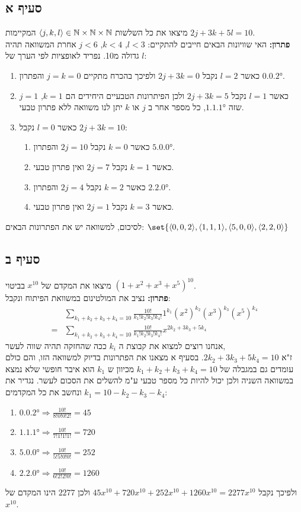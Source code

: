 \documentclass{article}
\DeclarePairedDelimiter\set\{\}
\begin{document}
	\subsection*{סעיף א}
	מיצאו את כל השלשות $\langle j,k,l \rangle \in \mathbb{N} \times \mathbb{N} \times \mathbb{N}$ המקיימות $2j+3k+5l=10$. \\
	\textbf{פתרון:} האי שוויונות הבאים חייבים להתקיים: $l < 3$, $k < 4$, $j < 6$ אחרת המשוואה תהיה גדולה מ10.
	נפריד לאופציות לפי הערך של $l$:
	\begin{enumerate}
		\item כאשר $l=2$ נקבל $2j+3k=0$ ולפיכך בהכרח מתקיים $j=k=0$ והפתרון $\boxed{\ang{0,0,2}}$.
		\item כאשר $l=1$ נקבל $2j+3k=5$ ולכן הפיתרונות הטבעיים היחידים הם $k=1$, $j=1$ שזה $\boxed{\ang{1,1,1}}$, כל מספר אחר ב $j$ או $k$ יתן לנו משוואה ללא פתרון טבעי.
		\item כאשר $l=0$ נקבל $2j+3k=10$:
		\begin{enumerate}
			\item כאשר $k=0$ נקבל $2j = 10$ והפתרון $\boxed{\ang{5,0,0}}$.
			\item כאשר $k=1$ נקבל $2j=7$ ואין פתרון טבעי.
			\item כאשר $k=2$ נקבל $2j=4$ והפתרון $\boxed{\ang{2,2,0}}$.
			\item כאשר $k=3$ נקבל $2j=1$ ואין פתרון טבעי.
		\end{enumerate}
	\end{enumerate}
	לסיכום, למשוואה יש את הפתרונות הבאים: $\set{\ang{0,0,2}, \ang{1,1,1}, \ang{5,0,0}, \ang{2,2,0}}$

	\subsection*{סעיף ב}
	מיצאו את המקדם של $x^{10}$ בביטוי $(1+x^2+x^3+x^5)^{10}$. \\
	\textbf{פתרון:}
	נציב את המולטינום במשוואת הפיתוח ונקבל:
	\begin{align*}
		&\sum_{k_1+k_2+k_3+k_4 = 10}\frac{10!}{k_1!k_2!k_3!k_4!}1^{k_1}(x^{2})^{k_2}(x^{3})^{k_3}(x^{5})^{k_4} \\
		= &\sum_{k_1+k_2+k_3+k_4 = 10}\frac{10!}{k_1!k_2!k_3!k_4!}x^{2k_2 + 3k_3 + 5k_4}
	\end{align*}
	אנחנו רוצים למצוא את קבוצת ה $k_i$ ככה שהחזקה תהיה שווה לעשר, \\
	 ז"א ${2k_2+3k_3+5k_4 = 10}$. בסעיף א מצאנו את הפתרונות בדיוק למשוואה הזו,
	והם כולם עומדים גם במגבלה של $k_1+k_2+k_3+k_4 = 10$ מכיוון ש $k_1$ הוא איבר חופשי שלא נמצא במשוואה השניה ולכן יכול להיות כל מספר טבעי ע"מ להשלים את הסכום לעשר.
	נגדיר את $k_1 = 10 - k_2 - k_3 - k_4$ ונחשב את כל המקדמים:
	\begin{enumerate}
		\item $\ang{0,0,2} \Rightarrow \frac{10!}{8!0!0!2!} = 45$
		\item $\ang{1,1,1} \Rightarrow \frac{10!}{7!1!1!1!} = 720$
		\item $\ang{5,0,0} \Rightarrow \frac{10!}{5!5!0!0!} = 252$
		\item $\ang{2,2,0} \Rightarrow \frac{10!}{6!2!2!0!} = 1260$
	\end{enumerate}
	ולפיכך נקבל $45x^{10} + 720x^{10} + 252x^{10} + 1260x^{10} = 2277x^{10}$
	ולכן $2277$ הינו המקדם של $x^{10}$.
\end{document}
